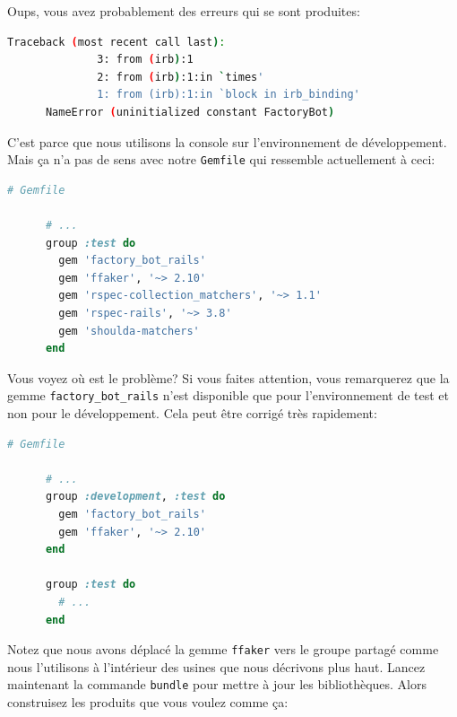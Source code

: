 \documentclass[]{report}
\begin{document}
    Oups, vous avez probablement des erreurs qui se sont produites:

    \begin{scriptsize}
      \begin{lstlisting}[language=bash]
      Traceback (most recent call last):
              3: from (irb):1
              2: from (irb):1:in `times'
              1: from (irb):1:in `block in irb_binding'
      NameError (uninitialized constant FactoryBot)
      \end{lstlisting}
    \end{scriptsize}

    C'est parce que nous utilisons la console sur l'environnement de développement. Mais ça n'a pas de sens avec notre \verb|Gemfile| qui ressemble actuellement à ceci:

    \begin{scriptsize}
      \begin{lstlisting}[language=ruby]
      # Gemfile

      # ...
      group :test do
        gem 'factory_bot_rails'
        gem 'ffaker', '~> 2.10'
        gem 'rspec-collection_matchers', '~> 1.1'
        gem 'rspec-rails', '~> 3.8'
        gem 'shoulda-matchers'
      end
      \end{lstlisting}
    \end{scriptsize}

    Vous voyez où est le problème? Si vous faites attention, vous remarquerez que la gemme \verb|factory_bot_rails| n'est disponible que pour l'environnement de test et non pour le développement. Cela peut être corrigé très rapidement:

    \begin{scriptsize}
      \begin{lstlisting}[language=ruby]
      # Gemfile

      # ...
      group :development, :test do
        gem 'factory_bot_rails'
        gem 'ffaker', '~> 2.10'
      end

      group :test do
        # ...
      end
      \end{lstlisting}
    \end{scriptsize}

    Notez que nous avons déplacé la gemme \verb|ffaker| vers le groupe partagé comme nous l'utilisons à l'intérieur des usines que nous décrivons plus haut. Lancez maintenant la commande \verb|bundle| pour mettre à jour les bibliothèques. Alors construisez les produits que vous voulez comme ça:
\end{document}
